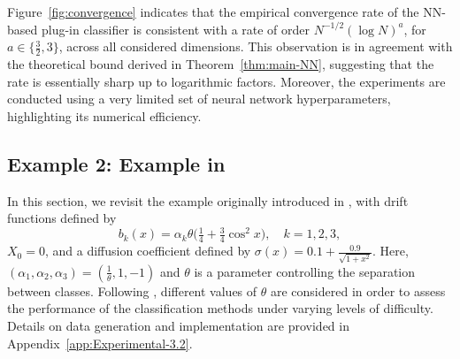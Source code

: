 \documentclass{article}
\theoremstyle{plain}
\theoremstyle{definition}
\theoremstyle{remark}
\begin{document}

Figure~\ref{fig:convergence} indicates that the empirical convergence rate of the NN-based plug-in classifier is consistent with a rate of order $N^{-1/2}(\log N)^a$, for $a \in \{\tfrac{3}{2}, 3\}$, across all considered dimensions. This observation is in agreement with the theoretical bound derived in Theorem~\ref{thm:main-NN}, suggesting that the rate is essentially sharp up to logarithmic factors. Moreover, the experiments are conducted using a very limited set of neural network hyperparameters, highlighting its numerical efficiency.









\subsection{Example 2: Example in \citet{Denis2024}}\label{sec:cos-example}


In this section, we revisit the example originally introduced in \citet{Denis2024}, with drift functions defined by
\begin{equation}\label{eq:numerical-def-b_k-cos}
b_k(x) = \alpha_k \theta \Big(\tfrac{1}{4} + \tfrac{3}{4}\cos^2 x\Big),
\quad k = 1,2,3,
\end{equation}
$X_0=0$, and a diffusion coefficient defined by $\sigma(x)=0.1+\tfrac{0.9}{\sqrt{1+x^2}}$. Here, $(\alpha_1, \alpha_2, \alpha_3)=(\frac{1}{\theta}, 1, -1)$ and $\theta$ is a parameter controlling the separation between classes. Following \citet{Denis2024}, different values of $\theta$ are considered in order to assess the performance of the classification methods under varying levels of difficulty. Details on data generation and implementation are provided in Appendix~\ref{app:Experimental-3.2}. %
\end{document}
